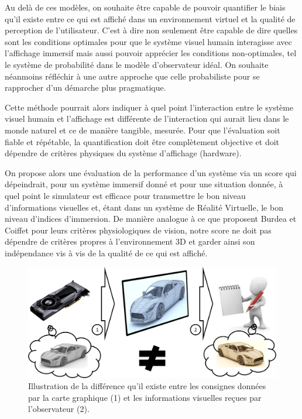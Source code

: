 	\par Au delà de ces modèles, on souhaite être capable de pouvoir quantifier le biais qu'il existe entre ce qui est affiché dans un environnement virtuel et la qualité de perception de l'utilisateur. C'est à dire non seulement être capable de dire quelles sont les conditions optimales pour que le système visuel humain interagisse avec l'affichage immersif mais aussi pouvoir apprécier les conditions non-optimales, tel le système de probabilité dans le modèle d'observateur idéal. On souhaite néanmoins réfléchir à une autre approche que celle probabiliste pour se rapprocher d'un démarche plus pragmatique.
	
	\par Cette méthode pourrait alors indiquer à quel point l'interaction entre le système visuel humain et l'affichage est différente de l'interaction qui aurait lieu dans le monde naturel et ce de manière tangible, mesurée. Pour que l'évaluation soit fiable et répétable, la quantification doit être complètement objective et doit dépendre de critères physiques du système d'affichage (hardware).
	
	\par On propose alors une évaluation de la performance d'un système via un score qui dépeindrait, pour un système immersif donné et pour une situation donnée, à quel point le simulateur est efficace pour transmettre le bon niveau d'informations visuelles et, étant dans un système de Réalité Virtuelle, le bon niveau d'indices d'immersion. De manière analogue à ce que proposent Burdea et Coiffet pour leurs critères physiologiques de vision, notre score ne doit pas dépendre de critères propres à l'environnement 3D et garder ainsi son indépendance vis à vis de la qualité de ce qui est affiché.
	
	\begin{figure}
		\centering
		\includegraphics[scale=.45]{Figures/ImageBias}
		\caption{Illustration de la différence qu'il existe entre les consignes données par la carte graphique (1) et les informations visuelles reçues par l'observateur (2).}
		\label{fig:image_bias}
	\end{figure}
			

